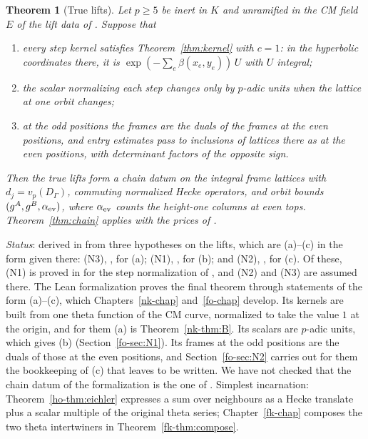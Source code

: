 \documentclass[reqno]{amsart}
\newcounter{chap}
\theoremstyle{definition}
\theoremstyle{plain}
\newtheorem{theorem}{Theorem}[section]
\begin{document}
\begin{theorem}[True lifts]\label{thm:true-lifts}
Let \(p\ge5\) be inert in \(K\) and unramified in the CM field \(E\) of the lift data of \cite[Defs.~11.5, 11.7 and~11.10]{Adr}.  Suppose that
\begin{enumerate}
\item[(a)] every step kernel satisfies Theorem~\ref{thm:kernel} with \(c=1\): in the hyperbolic coordinates there, it is \(\exp(-\sum_e\beta(x_e,y_e))\,U\) with \(U\) integral;
\item[(b)] the scalar normalizing each step changes only by \(p\)-adic units when the lattice at one orbit changes;
\item[(c)] at the odd positions the frames are the duals of the frames at the even positions, and entry estimates pass to inclusions of lattices there as at the even positions, with determinant factors of the opposite sign.
\end{enumerate}
Then the true lifts form a chain datum on the integral frame lattices with \(d_j=v_p(D_\Gamma)\), commuting normalized Hecke operators, and orbit bounds \((g^A,g^B,\alpha_{\rm ev})\), where \(\alpha_{\rm ev}\) counts the height-one columns at even tops. Theorem~\ref{thm:chain} applies with the prices of \cite[Prop.~11.32, Thm.~11.45]{Adr}.
\end{theorem}
\noindent \emph{Status}: derived in \cite[Thm.~11.45]{Adr} from three hypotheses on the lifts, which are (a)--(c) in the form given there: (N3), \cite[Hyp.~11.42]{Adr}, for (a); (N1), \cite[Hyp.~11.22]{Adr}, for (b); and (N2), \cite[Hyp.~11.38]{Adr}, for (c).  Of these, (N1) is proved in \cite[Prop.~11.27]{Adr} for the step normalization of \cite[Def.~11.23]{Adr}, and (N2) and (N3) are assumed there.  The Lean formalization \cite{Lean} proves the final theorem through statements of the form (a)--(c), which Chapters~\ref{nk-chap} and~\ref{fo-chap} develop.  Its kernels are built from one theta function of the CM curve, normalized to take the value \(1\) at the origin, and for them (a) is Theorem~\ref{nk-thm:B}.  Its scalars are \(p\)-adic units, which gives (b) (Section~\ref{fo-sec:N1}).  Its frames at the odd positions are the duals of those at the even positions, and Section~\ref{fo-sec:N2} carries out for them the bookkeeping of (c) that \cite[Rem.~11.39]{Adr} leaves to be written.  We have not checked that the chain datum of the formalization is the one of \cite[Thm.~11.45]{Adr}.  Simplest incarnation: Theorem~\ref{ho-thm:eichler} expresses a sum over neighbours as a Hecke translate plus a scalar multiple of the original theta series; Chapter~\ref{fk-chap} composes the two theta intertwiners in Theorem~\ref{fk-thm:compose}.
\end{document}
